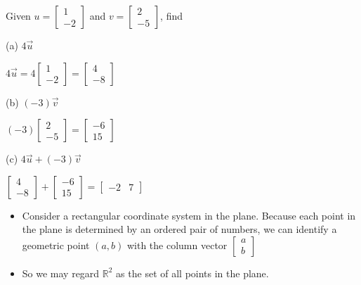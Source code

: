 \documentclass[../linalg.tex]{subfiles}
\begin{document}
\begin{example}
    Given $u=\begin{bmatrix}
        1\\-2
    \end{bmatrix}$ and $v=\begin{bmatrix}
        2\\-5
    \end{bmatrix}$, find 

    (a) $4\vec{u}$

    $4\vec{u}=4\begin{bmatrix}
        1\\-2
    \end{bmatrix}=\begin{bmatrix}
        4\\-8
    \end{bmatrix}$

    (b) $(-3)\vec{v}$

    $(-3)\begin{bmatrix}
        2\\-5
    \end{bmatrix}=\begin{bmatrix}
        -6\\15
    \end{bmatrix}$

    (c) $4\vec{u}+(-3)\vec{v}$

    $\begin{bmatrix}
        4\\-8
    \end{bmatrix}+\begin{bmatrix}
        -6\\15
    \end{bmatrix}=\begin{bmatrix}
        -2&7
    \end{bmatrix}$
\end{example}

\begin{itemize}
    \item Consider a rectangular coordinate system in the plane. Because each point in the plane is determined by an ordered pair of numbers, we can identify a geometric point $(a,b)$ with the column vector $\begin{bmatrix}
        a\\b
    \end{bmatrix}$
    \item So we may regard $\mathbb{R}^2$ as the set of all points in the plane.
\end{itemize}
\end{document}
